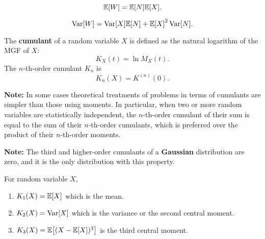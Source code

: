 \begin{theorem}
    \[\E{W}=\E{N}\E{X}.\]
\end{theorem}

\begin{theorem}
    \[\Var[W]=\Var[X]\E{N}+\E{X}^2\Var[N].\]
\end{theorem}

\begin{definition}
    The \textbf{cumulant} of a random variable $X$ is defined as the natural logarithm of the \textnormal{MGF} of $X$:
    \[K_X(t)=\ln M_X(t).\]
    The $n$-th-order cumulant $K_n$ is
    \[K_n(X)=K^{(n)}(0).\]
\end{definition}

\textbf{Note:} In some cases theoretical treatments of problems in terms of cumulants are simpler than those using moments. In particular, when two or more random variables are statistically independent, the $n$-th-order cumulant of their sum is equal to the sum of their $n$-th-order cumulants, which is preferred over the product of their $n$-th-order moments.

\textbf{Note:} The third and higher-order cumulants of a \textbf{Gaussian} distribution are zero, and it is the only distribution with this property.

\begin{theorem}
    For random variable $X$,
    \begin{enumerate}
        \item $K_1(X)=\E{X}$ which is the mean.
        \item $K_2(X)=\mathop{\mathrm{Var}}\nolimits[X]$ which is the variance or the second central moment.
        \item $K_3(X)=\E{(X-\E{X})^3}$ is the third central moment.
    \end{enumerate}
\end{theorem}

